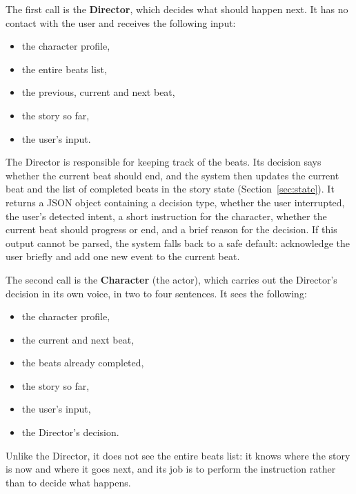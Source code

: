 The first call is the \textbf{Director}, which decides what should happen next. It has no contact with the user and receives the following input:
\begin{itemize}
  \item the character profile,
  \item the entire beats list,
  \item the previous, current and next beat,
  \item the story so far,
  \item the user's input.
\end{itemize}
The Director is responsible for keeping track of the beats. Its decision says whether the current beat should end, and the system then updates the current beat and the list of completed beats in the story state (Section~\ref{sec:state}). It returns a JSON object containing a decision type, whether the user interrupted, the user's detected intent, a short instruction for the character, whether the current beat should progress or end, and a brief reason for the decision. If this output cannot be parsed, the system falls back to a safe default: acknowledge the user briefly and add one new event to the current beat.

The second call is the \textbf{Character} (the actor), which carries out the Director's decision in its own voice, in two to four sentences. It sees the following:
\begin{itemize}
  \item the character profile,
  \item the current and next beat,
  \item the beats already completed,
  \item the story so far,
  \item the user's input,
  \item the Director's decision.
\end{itemize}
Unlike the Director, it does not see the entire beats list: it knows where the story is now and where it goes next, and its job is to perform the instruction rather than to decide what happens.

